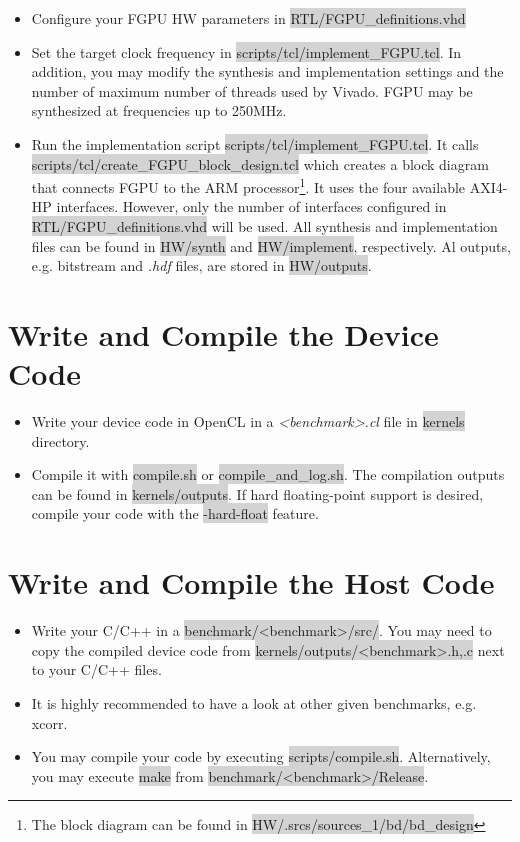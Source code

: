 \documentclass[11pt]{article}
\begin{document}
\begin{itemize}
  \item Configure your FGPU HW parameters in \colorbox{lightGray}{RTL/FGPU\_definitions.vhd}
  \item Set the target clock frequency in \colorbox{lightGray}{scripts/tcl/implement\_FGPU.tcl}. 
    In addition, you may modify the synthesis and implementation settings and the number of maximum number of threads used by Vivado.
    FGPU may be synthesized at frequencies up to 250MHz.
  \item Run the implementation script \colorbox{lightGray}{scripts/tcl/implement\_FGPU.tcl}. 
    It calls \colorbox{lightGray}{scripts/tcl/create\_FGPU\_block\_design.tcl} 
    which creates a block diagram that connects FGPU to the ARM processor\footnote{
      The block diagram can be found in \colorbox{lightGray}{HW/.srcs/sources\_1/bd/bd\_design}}.
    It uses the four available AXI4-HP interfaces. 
    However, only the number of interfaces configured in \colorbox{lightGray}{RTL/FGPU\_definitions.vhd} will be used.
    All synthesis and implementation files can be found in 
    \colorbox{lightGray}{HW/synth} and \colorbox{lightGray}{HW/implement}, respectively.
    Al outputs, e.g. bitstream and \emph{.hdf} files, are stored in \colorbox{lightGray}{HW/outputs}.
\end{itemize}

\section{Write and Compile the Device Code}
\begin{itemize}
  \item Write your device code in OpenCL in a \emph{<benchmark>.cl} file in \colorbox{lightGray}{kernels} directory.
  \item Compile it with \colorbox{lightGray}{compile.sh} or \colorbox{lightGray}{compile\_and\_log.sh}. 
    The compilation outputs can be found in \colorbox{lightGray}{kernels/outputs}.
    If hard floating-point support is desired, compile your code with the \colorbox{lightGray}{-hard-float} feature.
\end{itemize}

\section{Write and Compile the Host Code}
\begin{itemize}
  \item Write your C/C++ in a \colorbox{lightGray}{benchmark/<benchmark>/src/}.
    You may need to copy the compiled device code from \colorbox{lightGray}{kernels/outputs/<benchmark>{.h,.c}} next to your C/C++ files.
  \item It is highly recommended to have a look at other given benchmarks, e.g. xcorr.
  \item You may compile your code by executing \colorbox{lightGray}{scripts/compile.sh}.
    Alternatively, you may execute \colorbox{lightGray}{make} from \colorbox{lightGray}{benchmark/<benchmark>/Release}.
\end{itemize}
\end{document}
